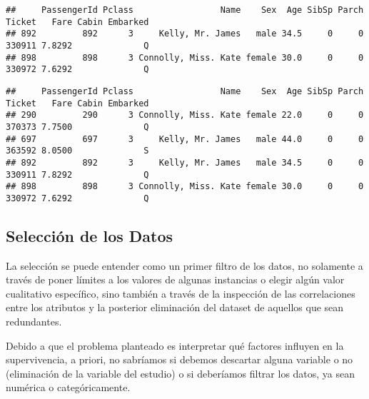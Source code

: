 \documentclass[
]{article}
\newenvironment{Shaded}{\begin{snugshade}}{\end{snugshade}}
\newcommand{\NormalTok}[1]{\textcolor[rgb]{0.80,0.80,0.80}{#1}}
\newcommand{\OperatorTok}[1]{\textcolor[rgb]{0.94,0.94,0.82}{#1}}
\newcommand{\StringTok}[1]{\textcolor[rgb]{0.80,0.58,0.58}{#1}}
\begin{document}
\begin{verbatim}
##     PassengerId Pclass                 Name    Sex  Age SibSp Parch Ticket   Fare Cabin Embarked
## 892         892      3     Kelly, Mr. James   male 34.5     0     0 330911 7.8292              Q
## 898         898      3 Connolly, Miss. Kate female 30.0     0     0 330972 7.6292              Q
\end{verbatim}

\begin{Shaded}
\end{Shaded}

\begin{verbatim}
##     PassengerId Pclass                 Name    Sex  Age SibSp Parch Ticket   Fare Cabin Embarked
## 290         290      3 Connolly, Miss. Kate female 22.0     0     0 370373 7.7500              Q
## 697         697      3     Kelly, Mr. James   male 44.0     0     0 363592 8.0500              S
## 892         892      3     Kelly, Mr. James   male 34.5     0     0 330911 7.8292              Q
## 898         898      3 Connolly, Miss. Kate female 30.0     0     0 330972 7.6292              Q
\end{verbatim}

\hypertarget{selecciuxf3n-de-los-datos}{%
\subsection{\texorpdfstring{\textbf{Selección de los
Datos}}{Selección de los Datos}}\label{selecciuxf3n-de-los-datos}}

La selección se puede entender como un primer filtro de los datos, no
solamente a través de poner límites a los valores de algunas instancias
o elegir algún valor cualitativo específico, sino también a través de la
inspección de las correlaciones entre los atributos y la posterior
eliminación del dataset de aquellos que sean redundantes.

Debido a que el problema planteado es interpretar qué factores influyen
en la supervivencia, a priori, no sabríamos si debemos descartar alguna
variable o no (eliminación de la variable del estudio) o si deberíamos
filtrar los datos, ya sean numérica o categóricamente.
\end{document}
